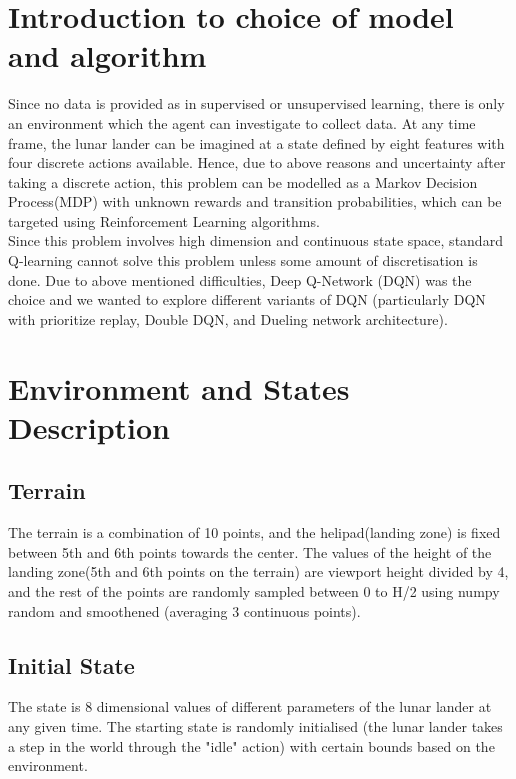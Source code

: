 \section{Introduction to choice of model and algorithm}
\label{intro}
Since no data is provided as in supervised or unsupervised learning, there is only an environment which the agent can investigate to collect data. At any time frame, the lunar lander can be imagined at a state defined by eight features with four discrete actions available. Hence, due to above reasons and uncertainty after taking a discrete action, this problem can be modelled as a Markov Decision Process(MDP) with unknown rewards and transition probabilities, which can be targeted using Reinforcement Learning algorithms. \\

Since this problem involves high dimension and continuous state space, standard Q-learning cannot solve this problem unless some amount of discretisation is done. Due to above mentioned difficulties, Deep Q-Network (DQN) was the choice and we wanted to explore different variants of DQN (particularly DQN with prioritize replay, Double DQN, and Dueling network architecture).


\section{Environment and States Description}

\subsection{Terrain}

The terrain is a combination of 10 points, and the helipad(landing zone) is fixed between 5th and 6th points towards the center. The values of the height of the landing zone(5th and 6th points on the terrain) are viewport height divided by 4, and the rest of the points are randomly sampled between 0 to H/2 using numpy random and smoothened (averaging 3 continuous points).

\subsection{Initial State}

The state is 8 dimensional values of different parameters of the lunar lander at any given time. The starting state is randomly initialised (the lunar lander takes a step in the world through the "idle" action) with certain bounds based on the environment.

